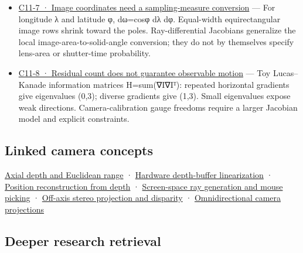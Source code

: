\begin{itemize}
\item
  \hyperref[02-foundations-ii-ch035-figure-c11-7-image-coordinates-need-a-sampling-measure-conversion]{C11-7 · Image coordinates need a sampling-measure conversion} --- For longitude λ and latitude φ, dω=cosφ dλ dφ. Equal-width equirectangular image rows shrink toward the poles. Ray-differential Jacobians generalize the local image-area-to-solid-angle conversion; they do not by themselves specify lens-area or shutter-time probability.
\item
  \hyperref[02-foundations-ii-ch035-figure-c11-8-residual-count-does-not-guarantee-observable-motion]{C11-8 · Residual count does not guarantee observable motion} --- Toy Lucas--Kanade information matrices H=sum(∇I∇Iᵀ): repeated horizontal gradients give eigenvalues (0,3); diverse gradients give (1,3). Small eigenvalues expose weak directions. Camera-calibration gauge freedoms require a larger Jacobian model and explicit constraints.
\end{itemize}

\subsection{Linked camera concepts}\label{appendix-a2b71a18f5a2-linked-camera-concepts}

\hyperref[appendix-cac01ebeeb11]{Axial depth and Euclidean range} · \hyperref[appendix-1bc40b08db4a]{Hardware depth-buffer linearization} · \hyperref[appendix-2cbf2968e866]{Position reconstruction from depth} · \hyperref[appendix-f1a6d43e80d1]{Screen-space ray generation and mouse picking} · \hyperref[appendix-0976e86e5b9f]{Off-axis stereo projection and disparity} · \hyperref[appendix-fc99ad39f351]{Omnidirectional camera projections}

\subsection{Deeper research retrieval}\label{appendix-a2b71a18f5a2-deeper-research-retrieval}


